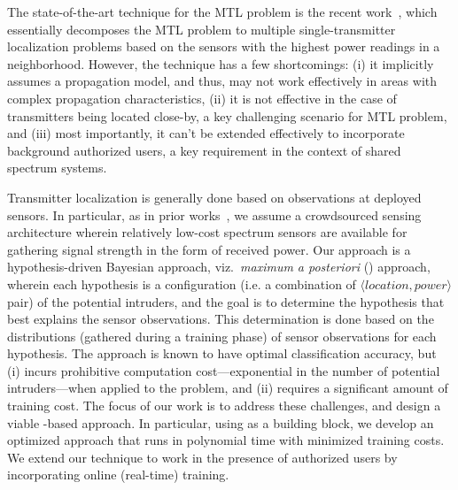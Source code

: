 The state-of-the-art technique for the MTL problem is the recent
work~\cite{mobicom17-splot}, which essentially decomposes the MTL
problem to multiple single-transmitter localization problems based on
the sensors with the highest power readings in a
neighborhood.  However, the technique has
a few shortcomings: (i) it implicitly assumes a propagation model, and
thus, may not work effectively in areas with complex propagation
characteristics, (ii) it is not effective in the case of transmitters
being located close-by, a key challenging scenario for MTL problem,
and (iii) most importantly, it can't be extended effectively to
incorporate background authorized users, a key requirement in the
context of shared spectrum systems. 

  Transmitter localization is generally done based
on observations at deployed sensors. In particular, as in prior
works~\cite{mobicom17-splot,chakraborty2017specsense}, we assume a
crowdsourced sensing architecture wherein relatively low-cost spectrum
sensors are available for gathering signal strength in the form of
received power. Our approach is a hypothesis-driven Bayesian approach,
viz.\ {\em maximum a posteriori} (\map) approach, wherein each
hypothesis is a configuration (i.e.  a combination of $\langle
location, power \rangle$ pair) of the potential intruders, and the
goal is to determine the hypothesis that best explains the sensor
observations. This determination is done based on the distributions
(gathered during a training phase) of sensor observations for each
hypothesis.
The \map approach is known to have optimal classification accuracy,
but (i) incurs prohibitive computation cost---exponential in the number of
potential intruders---when applied to the \mtl problem, and (ii)
requires a significant amount of training cost. The focus of our work is
to address these challenges, and design a viable \map-based approach.
In particular, using \map as a building block, we develop an optimized
approach that runs in polynomial time with minimized training costs.
We extend our technique to work in the presence of authorized users by
incorporating online (real-time) training.


